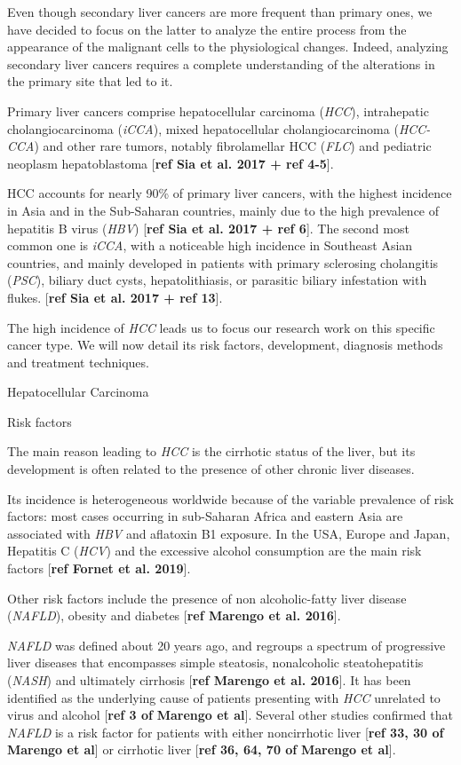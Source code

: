 \documentclass[]{article}
\begin{document}
Even though secondary liver cancers are more frequent than primary ones,
we have decided to focus on the latter to analyze the entire process
from the appearance of the malignant cells to the physiological changes.
Indeed, analyzing secondary liver cancers requires a complete
understanding of the alterations in the primary site that led to it.

Primary liver cancers comprise hepatocellular carcinoma (\emph{HCC}),
intrahepatic cholangiocarcinoma (\emph{iCCA}), mixed hepatocellular
cholangiocarcinoma (\emph{HCC-CCA}) and other rare tumors, notably
fibrolamellar HCC (\emph{FLC}) and pediatric neoplasm hepatoblastoma
{[}\textbf{ref Sia et al. 2017 + ref 4-5}{]}.

HCC accounts for nearly 90\% of primary liver cancers, with the highest
incidence in Asia and in the Sub-Saharan countries, mainly due to the
high prevalence of hepatitis B virus (\emph{HBV}) {[}\textbf{ref Sia et
al. 2017 + ref 6}{]}. The second most common one is \emph{iCCA}, with a
noticeable high incidence in Southeast Asian countries, and mainly
developed in patients with primary sclerosing cholangitis (\emph{PSC}),
biliary duct cysts, hepatolithiasis, or parasitic biliary infestation
with flukes. {[}\textbf{ref Sia et al. 2017 + ref 13}{]}.

The high incidence of \emph{HCC} leads us to focus our research work on
this specific cancer type. We will now detail its risk factors,
development, diagnosis methods and treatment techniques.

\protect\hypertarget{anchor-1}{}{}Hepatocellular Carcinoma

\protect\hypertarget{anchor-2}{}{}Risk factors

The main reason leading to \emph{HCC} is the cirrhotic status of the
liver, but its development is often related to the presence of other
chronic liver diseases.

Its incidence is heterogeneous worldwide because of the variable
prevalence of risk factors: most cases occurring in sub-Saharan Africa
and eastern Asia are associated with \emph{HBV} and aflatoxin B1
exposure. In the USA, Europe and Japan, Hepatitis C (\emph{HCV}) and the
excessive alcohol consumption are the main risk factors {[}\textbf{ref
Fornet et al. 2019}{]}.

Other risk factors include the presence of non alcoholic-fatty liver
disease (\emph{NAFLD}), obesity and diabetes {[}\textbf{ref Marengo et
al. 2016}{]}.

\emph{NAFLD} was defined about 20 years ago, and regroups a spectrum of
progressive liver diseases that encompasses simple steatosis,
nonalcoholic steatohepatitis (\emph{NASH}) and ultimately cirrhosis
{[}\textbf{ref Marengo et al. 2016}{]}. It has been identified as the
underlying cause of patients presenting with \emph{HCC} unrelated to
virus and alcohol {[}\textbf{ref 3 of} \textbf{Marengo et al}{]}.
Several other studies confirmed that \emph{NAFLD} is a risk factor for
patients with either noncirrhotic liver {[}\textbf{ref 33, 30 of}
\textbf{Marengo et al}{]} or cirrhotic liver {[}\textbf{ref 36, 64, 70
of} \textbf{Marengo et al}{]}.
\end{document}
